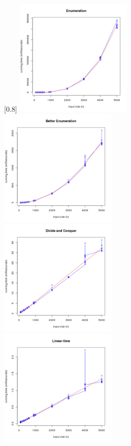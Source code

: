\documentclass[11pt]{scrreprt}
\begin{document}
\begin{figure}[!htbp]
	\captionsetup{singlelinecheck=off}
	\captionsetup[subfigure]{singlelinecheck=on}
	[0.8\textwidth]{%
		\includegraphics[width=0.50\textwidth]{enumeration.png}%
		\includegraphics[width=0.50\textwidth]{better_enumeration.png}\\
		\includegraphics[width=0.50\textwidth]{divide_n_conquer.png}%
		\includegraphics[width=0.50\textwidth]{linear_time.png}%
	}%
\end{figure}
\end{document}
